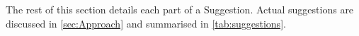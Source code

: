 The rest of this section details each part of a \textsf{Suggestion}.
Actual suggestions are discussed in \cref{sec:Approach} and summarised in \cref{tab:suggestions}.









